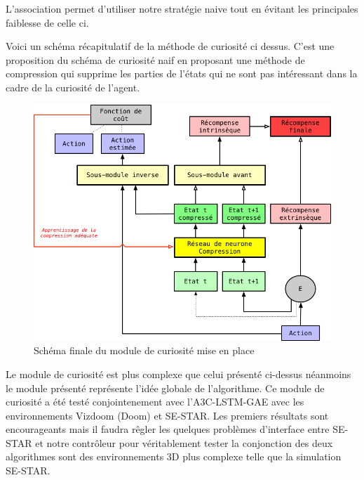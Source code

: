L'association permet d'utiliser notre stratégie naive tout en évitant les principales  faiblesse de celle ci.

Voici un schéma récapitulatif de la méthode de curiosité ci dessus. C'est une proposition du schéma de curiosité naif en proposant une méthode de compression qui supprime les parties de l'états qui ne sont pas intéressant dans la cadre de la curiosité de l'agent.

\begin{figure}[h!]
    \begin{center}
        \includegraphics[scale=.4]{./assets/CURIOSITY/curiosity2.png}
        \caption{Schéma finale du module de curiosité mise en place}
    \end{center}
\end{figure}

Le module de curiosité est plus complexe que celui présenté ci-dessus néanmoins le module présenté représente l'idée globale de l'algorithme. Ce module de curiosité a été testé conjointenement avec l'A3C-LSTM-GAE avec les environnements Vizdoom (Doom) et SE-STAR. Les premiers résultats sont encourageants mais il faudra rêgler les quelques problèmes d'interface entre SE-STAR et notre contrôleur pour véritablement tester la conjonction des deux algorithmes sont des environnements 3D plus complexe telle que  la simulation SE-STAR. 
